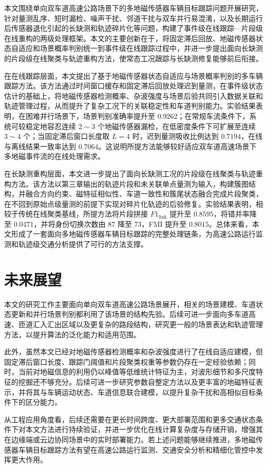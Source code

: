 \documentclass{xdupgthesis}
\begin{document}
本文围绕单向双车道高速公路场景下的多地磁传感器车辆目标跟踪问题开展研究，针对量测乱序、短时漏检、噪声干扰、邻道干扰与双车并行易混淆，以及长期运行后传感器退化引起的长缺测和轨迹碎片化等问题，构建了事件级在线跟踪—片段级在线重构的两级处理框架。本文的主要创新在于，将固定滞后回放、地磁传感器状态自适应和场景概率判别统一到事件级在线跟踪过程中，并进一步提出面向长缺测的片段级在线聚类与轨迹重构方法，使常态工况跟踪与长缺测修复能够前后衔接。

在在线跟踪层面，本文提出了基于地磁传感器状态自适应与场景概率判别的多车辆跟踪方法。该方法通过时间窗口缓存和固定滞后回放处理迟到量测，在事件级状态估计的基础上，将地磁传感器检测概率、杂波强度与场景后验共同引入数据关联和轨迹管理过程，从而提升了复杂工况下的关联稳定性和车道判别能力。实验结果表明，在困难并行场景下，场景判别准确率提升至 $0.9262$；在常规车流条件下，系统可较稳定地容忍连续 $2\sim3$ 个地磁传感器漏检，在低密度条件下可扩展至连续 $3\sim4$ 个；当固定滞后窗口长度取 $L=4$ 时，迟到量测吸收比例达到 $0.7194$，在线与离线结果一致率达到 $0.7064$。这说明所提方法能够较好适应双车道高速场景下多地磁事件流的在线处理需求。

在长缺测重构层面，本文进一步提出了面向长缺测工况的片段级在线聚类与轨迹重构方法。该方法以第三章输出的轨迹片段和未关联单点量测为输入，构建簇图结构，并融合方向约束、磁特征相似性、车道一致性和簇尾状态融合完成片段聚类，在不回到原始点级量测的前提下实现对碎片化轨迹的后验修复。实验结果表明，相较于传统在线聚类基线，所提方法将片段拼接 $F1_{\mathrm{link}}$ 提升至 $0.8595$，将错并率降至 $0.0471$，并将身份切换次数由 $87$ 降至 $73$，FMI 提升至 $0.8015$。总体来看，本文形成了一套面向多地磁传感器车辆目标跟踪的完整处理链条，为高速公路运行监测和轨迹级交通分析提供了可行的方法支撑。

\section{未来展望}

本文的研究工作主要面向单向双车道高速公路场景展开，相关的场景建模、车道状态更新和并行场景判别都利用了该场景的结构先验。后续可进一步面向多车道高速、匝道汇入汇出区域以及更复杂的路段结构，研究更一般的场景表达和轨迹管理方法，以提升算法的泛化能力和适用范围。

此外，虽然本文已经对地磁传感器检测概率和杂波强度进行了在线自适应建模，但固定滞后窗口长度、跟踪门阈值和片段聚类权重等参数仍存在一定经验依赖；同时，当前对地磁信息的利用仍以峰值等低维统计特征为主，对波形细节和多尺度特征的挖掘还不够充分。后续可进一步研究参数自整定方法以及更丰富的地磁特征表示，并将其与车辆运动状态、车道信息联合建模，以提升复杂干扰和高相似目标条件下的区分能力。

从工程应用角度看，后续还需要在更长时间跨度、更大部署范围和更多交通状态条件下对本文方法进行持续验证，并进一步优化在线计算复杂度与存储开销，增强其在边缘端或云边协同场景中的实时部署能力。若上述问题能够继续推进，多地磁传感器车辆目标跟踪方法有望在高速公路运行监测、交通安全分析和精细化管控中发挥更大作用。
\end{document}
